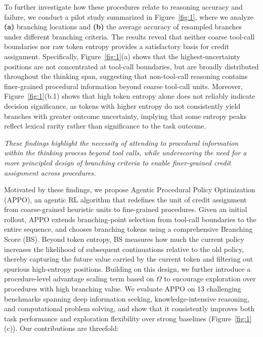 \documentclass{article}
\begin{document}
To further investigate how these procedures relate to reasoning accuracy and failure, we conduct a pilot study summarized in Figure~\ref{fig:1}, where we analyze \textbf{(a)} branching locations and \textbf{(b)} the average accuracy of resampled branches under different branching criteria. The results reveal that neither coarse tool-call boundaries nor raw token entropy provides a satisfactory basis for credit assignment. Specifically, Figure~\ref{fig:1}(a) shows that the highest-uncertainty positions are not concentrated at tool-call boundaries, but are broadly distributed throughout the thinking span, suggesting that non-tool-call reasoning contains finer-grained procedural information beyond coarse tool-call units. Moreover, Figure~\ref{fig:1}(b.1) shows that high token entropy alone does not reliably indicate decision significance, as tokens with higher entropy do not consistently yield branches with greater outcome uncertainty, implying that some entropy peaks reflect lexical rarity rather than significance to the task outcome. 

 \begin{tcolorbox}[
  colback=gray!10,     
  colframe=black,      
  boxrule=1pt,        
  arc=2mm,           
  left=4pt,right=4pt,top=4pt,bottom=4pt, 
]
 \textit{These findings highlight the necessity of attending to procedural information within the thinking process beyond tool calls, while underscoring the need for a more principled design of branching criteria to enable finer-grained credit assignment across procedures.}
\end{tcolorbox}


Motivated by these findings, we propose Agentic Procedural Policy Optimization (APPO), an agentic RL algorithm that redefines the unit of credit assignment from coarse-grained heuristic units to fine-grained procedures. Given an initial rollout, APPO extends branching-point selection from tool-call boundaries to the entire sequence, and chooses branching tokens using a comprehensive Branching Score (BS). Beyond token entropy, BS measures how much the current policy increases the likelihood of subsequent continuations relative to the old policy, thereby capturing the future value carried by the current token and filtering out spurious high-entropy positions. Building on this design, we further introduce a procedure-level advantage scaling term based on $\Omega$ to encourage exploration over procedures with high branching value. We evaluate APPO on 13 challenging benchmarks spanning deep information seeking, knowledge-intensive reasoning, and computational problem solving, and show that it consistently improves both task performance and exploration flexibility over strong baselines (Figure~\ref{fig:1}(c)). Our contributions are threefold:  
\end{document}

